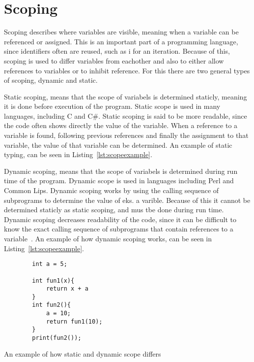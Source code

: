 \section{Scoping}\label{sec:scoping}
Scoping describes where variables are visible, meaning when a variable can be referenced or assigned. This is an important part of a programming language, since identifiers often are reused, such as i for an iteration. Because of this, scoping is used to differ variables from eachother and also to either allow references to variables or to inhibit reference. For this there are two general types of scoping, dynamic and static.

Static scoping, means that the scope of variabels is determined staticly, meaning it is done before execution of the program. Static scope is used in many languages, including C and C\#. Static scoping is said to be more readable, since the code often shows directly the value of the variable. When a reference to a variable is found, following previous references and finally the assignment to that variable, the value of that variable can be determined. An example of static typing, can be seen in Listing~\ref{lst:scopeexample}.

Dynamic scoping, means that the scope of variabels is determined during run time of the program. Dynamic scope is used in languages including Perl and Common Lips. Dynamic scoping works by using the calling sequence of subprograms to determine the value of eks. a varible. Because of this it cannot be determined staticly as static scoping, and mus tbe done during run time. Dynamic scoping decreases readability of the code, since it can be difficult to know the exact calling sequence of subprograms that contain references to a variable~\cite{Sebesta2016}. An example of how dynamic scoping works, can be seen in Listing~\ref{lst:scopeexample}.

\begin{listing}[htb!]
    \begin{verbatim}
        int a = 5;

        int fun1(x){
            return x + a
        }
        int fun2(){
            a = 10;
            return fun1(10);
        }
        print(fun2());
    \end{verbatim}
    \caption{An example of how static and dynamic scope differs}
    \label{lst:scopeexample}
\end{listing}

